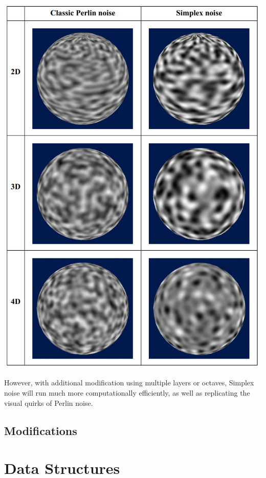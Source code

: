\documentclass[10pt]{report}
\begin{document}
		\begin{minipage}{\textwidth}
			\centering
			\includegraphics[scale=.25]{perlin vs simplex}
			\label{fig:fig4}
		\end{minipage}
		
		However, with additional modification using multiple layers or octaves, Simplex noise will run much more computationally efficiently, as well as replicating the visual quirks of Perlin noise.
		
		\section{Modifications}
		
		
	\vspace{10pt}
	\let\clearpage\relax
	\chapter{Data Structures} \label{chap:data_structures}
	
\end{document}
